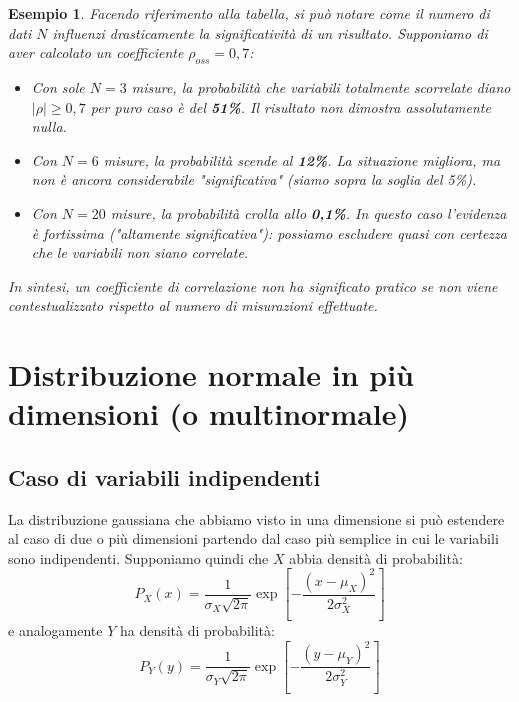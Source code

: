 \documentclass[openany,a4paper,12pt]{book}
\newtheorem*{example}{Esempio}
\theoremstyle{remark}
\begin{document}
\begin{example}
Facendo riferimento alla tabella, si può notare come il numero di dati $N$ influenzi drasticamente la significatività di un risultato. Supponiamo di aver calcolato un coefficiente $\rho_{oss} = 0,7$:
\begin{itemize}
    \item Con sole \textbf{$N=3$} misure, la probabilità che variabili totalmente scorrelate diano $|\rho| \ge 0,7$ per puro caso è del \textbf{51\%}. Il risultato non dimostra assolutamente nulla.
    \item Con \textbf{$N=6$} misure, la probabilità scende al \textbf{12\%}. La situazione migliora, ma non è ancora considerabile "significativa" (siamo sopra la soglia del 5\%).
    \item Con \textbf{$N=20$} misure, la probabilità crolla allo \textbf{0,1\%}. In questo caso l'evidenza è fortissima ("altamente significativa"): possiamo escludere quasi con certezza che le variabili non siano correlate.
\end{itemize}
In sintesi, un coefficiente di correlazione non ha significato pratico se non viene contestualizzato rispetto al numero di misurazioni effettuate.
\end{example}


\section{Distribuzione normale in più dimensioni (o multinormale)}
\subsection*{Caso di variabili indipendenti}
La distribuzione gaussiana che abbiamo visto in una dimensione si può estendere al caso di due o più dimensioni partendo dal caso più semplice in cui le variabili sono indipendenti. Supponiamo quindi che $X$ abbia densità di probabilità:
\begin{equation}
    P_X(x) = \frac{1}{\sigma_X \sqrt{2\pi}} \exp\left[ -\frac{(x-\mu_X)^2}{2\sigma_X^2} \right]
\end{equation}
e analogamente $Y$ ha densità di probabilità:
\begin{equation}
    P_Y(y) = \frac{1}{\sigma_Y \sqrt{2\pi}} \exp\left[ -\frac{(y-\mu_Y)^2}{2\sigma_Y^2} \right]
\end{equation}
\end{document}
